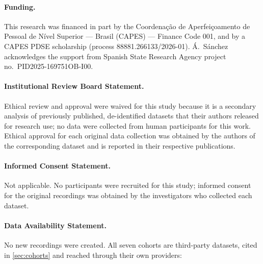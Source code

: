 \documentclass[10pt,a4paper]{article}
\begin{document}
\paragraph{Funding.} This research was financed in part by the Coordena\c{c}\~ao de
Aperfei\c{c}oamento de Pessoal de N\'ivel Superior --- Brasil (CAPES) --- Finance Code 001, and by
a CAPES PDSE scholarship (process 88881.266133/2026-01). \'A.~S\'anchez acknowledges the support
from Spanish State Research Agency project no.\ PID2025-169751OB-I00.

\paragraph{Institutional Review Board Statement.} Ethical review and approval were waived for this
study because it is a secondary analysis of previously published, de-identified datasets that their
authors released for research use; no data were collected from human participants for this work.
Ethical approval for each original data collection was obtained by the authors of the corresponding
dataset and is reported in their respective publications.

\paragraph{Informed Consent Statement.} Not applicable. No participants were recruited for this
study; informed consent for the original recordings was obtained by the investigators who collected
each dataset.

\begingroup\sloppy
\paragraph{Data Availability Statement.} No new recordings were created. All seven cohorts are
third-party datasets, cited in \cref{sec:cohorts} and reached through their own providers:
\end{document}
